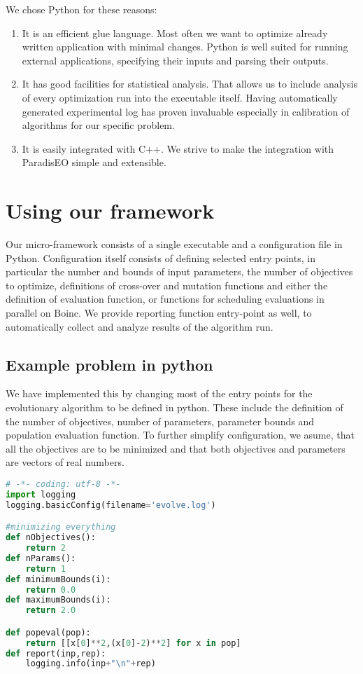 \documentclass[12pt,oneside]{fithesis2}
\begin{document}
We chose Python for these reasons:
\begin{enumerate}
\item It is an efficient glue language. 
Most often we want to optimize already written application with minimal changes. Python is well suited for running external applications, specifying their inputs and parsing their outputs.
 
\item It has good facilities for statistical analysis.
That allows us to include analysis of every optimization run into the executable itself. Having automatically generated experimental log has proven invaluable especially in calibration of algorithms for our specific problem.

\item It is easily integrated with C++.
We strive to make the integration with ParadisEO simple and extensible. 
\end{enumerate}



\section{Using our framework}

Our micro-framework consists of a single executable and a configuration file in Python. Configuration itself consists of defining selected entry points, in particular the number and bounds of input parameters, the number of objectives to optimize, definitions of cross-over and mutation functions and either the definition of evaluation function, or functions for scheduling evaluations in parallel on Boinc. We provide reporting function entry-point as well, to automatically collect and analyze results of the algorithm run.


\subsection{Example problem in python}
We have implemented this by changing most of the entry points for the evolutionary algorithm to be defined in python. These include the definition of the number of objectives, number of parameters, 
parameter bounds and population evaluation function. To further simplify configuration, we asume, that all the objectives are to be minimized and that both objectives and parameters are vectors of real numbers.

\begin{lstlisting}[language=Python,label=min_example,caption=Minimal working example]
# -*- coding: utf-8 -*-
import logging
logging.basicConfig(filename='evolve.log')

#minimizing everything 
def nObjectives():
	return 2
def nParams():
	return 1
def minimumBounds(i):
	return 0.0
def maximumBounds(i):
	return 2.0

def popeval(pop):
	return [[x[0]**2,(x[0]-2)**2] for x in pop]
def report(inp,rep):
	logging.info(inp+"\n"+rep) 
\end{lstlisting}
\end{document}
